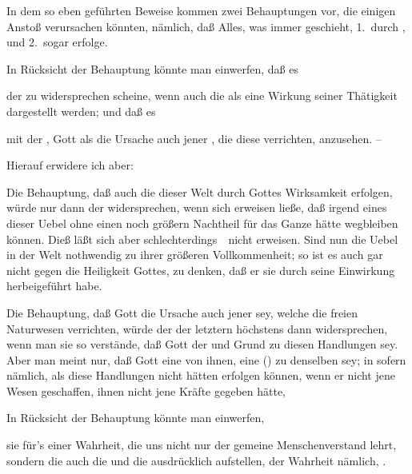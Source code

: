In dem so eben geführten Beweise kommen zwei Behauptungen vor, die einigen Anstoß verursachen könnten, nämlich, daß Alles, was immer geschieht, 1.~durch , und 2.~sogar  erfolge.
\begin{aufza}
\item In Rücksicht der  Behauptung könnte man einwerfen, daß es
\begin{aufzb}
\item der  zu widersprechen scheine, wenn auch die  als eine Wirkung seiner Thätigkeit dargestellt werden; und daß es
\item mit der , Gott als die Ursache auch jener , die diese verrichten, anzusehen. -- \par
Hierauf erwidere ich aber:
\begin{aufzc}
\item Die Behauptung, daß auch die  dieser Welt durch Gottes Wirksamkeit erfolgen, würde nur dann der  widersprechen, wenn sich erweisen ließe, daß irgend eines dieser Uebel ohne einen noch größern Nachtheil für das Ganze hätte wegbleiben können. Dieß läßt sich aber schlechterdings~\ nicht erweisen. Sind nun die Uebel in der Welt nothwendig zu ihrer größeren Vollkommenheit; so ist es auch gar nicht gegen die Heiligkeit Gottes, zu denken, daß er sie durch seine Einwirkung herbeigeführt habe.
\item Die Behauptung, daß Gott die Ursache auch jener  sey, welche die freien Naturwesen verrichten, würde der  der letztern höchstens dann widersprechen, wenn man sie so verstände, daß Gott der  und  Grund zu diesen Handlungen sey. Aber man meint nur, daß Gott eine  von ihnen, eine  () zu denselben sey; in sofern nämlich, als diese Handlungen nicht hätten erfolgen können, wenn er nicht jene Wesen geschaffen, ihnen nicht jene Kräfte gegeben hätte, \usw\
\end{aufzc}
\end{aufzb}
\item In Rücksicht der  Behauptung könnte man einwerfen,
\begin{aufzb} 
\item sie  für's  einer Wahrheit, die uns nicht nur der gemeine Menschenverstand lehrt, sondern die auch die  und die  ausdrücklich aufstellen, der Wahrheit nämlich, .

\end{aufzb}
\end{aufza}
